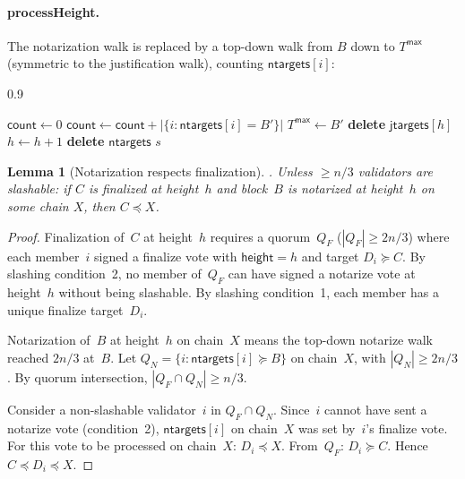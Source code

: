 \documentclass{article}
\newcommand{\jtargets}{\mathsf{jtargets}}
\newcommand{\ntargets}{\mathsf{ntargets}}
\newcommand{\height}{\mathsf{height}}
\newcommand{\cnt}{\mathsf{count}}
\theoremstyle{plain}
\newtheorem{lemma}{Lemma}
\theoremstyle{definition}
\theoremstyle{remark}
\begin{document}
\paragraph{processHeight.} The notarization walk is replaced by a top-down walk from $B$ down to $T^\mathsf{max}$ (symmetric to the justification walk), counting $\ntargets[i]$:
\begin{center}
\begin{boxedminipage}{0.9\textwidth}
\begin{algorithmic}[1]
  \State $\cnt \gets 0$ 
    \State $\cnt \gets \cnt + |\{i : \ntargets[i] = B'\}|$
    \If{$\cnt \geq 2n/3$} 
        \State $T^\mathsf{max}\gets B'$
      \Else
        \State \textbf{delete} $\jtargets[h]$
      \EndIf
      \State $h \gets h + 1$
      \State \textbf{delete} $\ntargets$
      \State \Return $s$
    \EndIf
  \EndFor
\end{algorithmic}
\end{boxedminipage}
\end{center}

\begin{lemma}[Notarization respects finalization]
.
Unless $\geq n/3$ validators are slashable: if $C$ is finalized at height~$h$ and block~$B$ is notarized at height~$h$ on some chain $X$, then $C \preceq X$.
\end{lemma}

\begin{proof}
Finalization of~$C$ at height~$h$ requires a quorum~$Q_F$ ($|Q_F| \geq 2n/3$) where each member~$i$ signed a finalize vote with $\height = h$ and target $D_i \succeq C$.
By slashing condition~2, no member of~$Q_F$ can have signed a notarize vote at height~$h$ without being slashable.
By slashing condition~1, each member has a unique finalize target~$D_i$.

Notarization of~$B$ at height~$h$ on chain~$X$ means the top-down notarize walk reached $2n/3$ at~$B$.
Let $Q_N = \{i : \ntargets[i] \succeq B\}$ on chain~$X$, with $|Q_N| \geq 2n/3$.
By quorum intersection, $|Q_F \cap Q_N| \geq n/3$.

Consider a non-slashable validator~$i$ in $Q_F \cap Q_N$.
Since~$i$ cannot have sent a notarize vote (condition~2), $\ntargets[i]$ on chain~$X$ was set by~$i$'s finalize vote.
For this vote to be processed on chain~$X$: $D_i \preceq X$.
From~$Q_F$: $D_i \succeq C$.
Hence $C \preceq D_i \preceq X$.
\end{proof}
\end{document}
